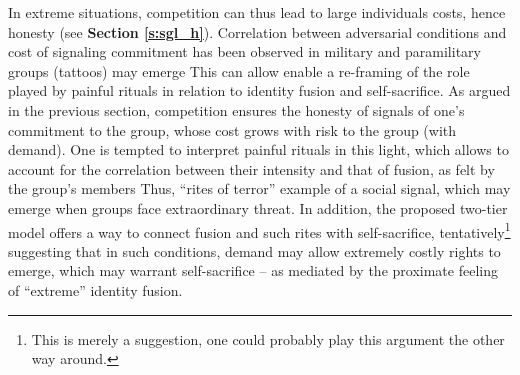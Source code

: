 \documentclass[a4paper,12pt]{report}
\begin{document}
In extreme situations, competition can thus lead to large individuals costs,
hence honesty (see \textbf{Section \ref{s:sgl_h}}). Correlation between adversarial conditions and
cost of signaling commitment has been observed in military and paramilitary groups
(tattoos) may emerge %
This can allow enable a re-framing of the role played by painful rituals in
relation to identity fusion and self-sacrifice. As argued in the previous section,
competition ensures the honesty of signals of one’s commitment to the group, whose
cost grows with risk to the group (with demand). One is tempted to interpret painful
rituals in this light, which allows to account for the correlation between their
intensity and that of fusion, as felt by the group’s members %
Thus, “rites of terror” %
example of a social signal, which may emerge when groups face extraordinary threat.
In addition, the proposed two-tier model offers a way to connect fusion and such rites
with self-sacrifice, tentatively\footnote{
    This is merely a suggestion, one could probably play this argument
    the other way around.}
suggesting that in such conditions, demand may allow
extremely costly rights to emerge, which may warrant self-sacrifice – as mediated by
the proximate feeling of “extreme” identity fusion.

\end{document}
